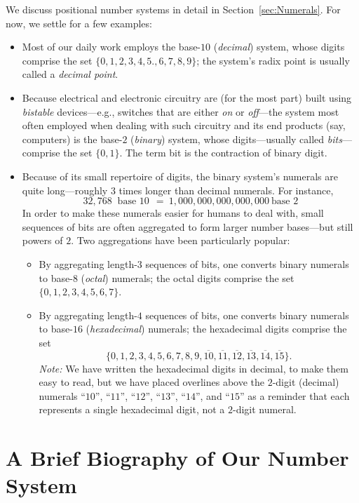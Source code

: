 \noindent
We discuss positional number systems in detail in
Section~\ref{sec:Numerals}.  For now, we settle for a few examples:
\begin{itemize}
\item
Most of our daily work employs the base-$10$ ({\it decimal}) system,
whose digits comprise the set $\{0, 1, 2, 3, 4, 5., 6, 7, 8, 9\}$; the
system's radix point is usually called a {\em decimal point}.

\item
Because electrical and electronic circuitry are (for the most part)
built using {\it bistable} devices---e.g., switches that are either
{\em on} or {\em off}---the system most often employed when dealing
with such circuitry and its end products (say, computers) is the
base-$2$ ({\it binary}) system, whose digits---usually called {\it
  bits}---comprise the set $\{0, 1\}$.
  The term bit is the contraction of binary digit. 

\item
Because of its small repertoire of digits, the binary system's
numerals are quite long---roughly $3$ times longer than decimal
numerals.  For instance,
\[ 32,768 \ \mbox{ base $10$} \ \ = \ 1,000,000,000,000,000 \ \mbox{
  base $2$}
\]
In order to make these numerals easier for humans to deal with, small
sequences of bits are often aggregated to form larger number bases---but
still powers of $2$.  Two aggregations have been particularly popular:
  \begin{itemize}
  \item
By aggregating length-$3$ sequences of bits, one converts binary
numerals to base-$8$ ({\it octal}) numerals; the octal digits comprise
the set $\{0, 1, 2, 3, 4, 5, 6, 7\}$.
  \item
By aggregating length-$4$ sequences of bits, one converts binary
numerals to base-$16$ ({\it hexadecimal}) numerals; the hexadecimal
digits comprise the set
\[ \{0, 1, 2, 3, 4, 5, 6, 7, 8, 9, \overline{10}, \overline{11},
\overline{12}, \overline{13}, \overline{14}, \overline{15}\}.
\]
{\it Note:} We have written the hexadecimal digits in decimal, to make
them easy to read, but we have placed overlines above the $2$-digit
(decimal) numerals ``$10$'', ``$11$'', ``$12$'', ``$13$'', ``$14$'',
and ``$15$'' as a reminder that each represents a single hexadecimal
digit, not a $2$-digit numeral.
  \end{itemize}
\end{itemize}


\section{A Brief Biography of Our Number System}
\label{sec:number-taxonomy}
\label{sec:numbers}

